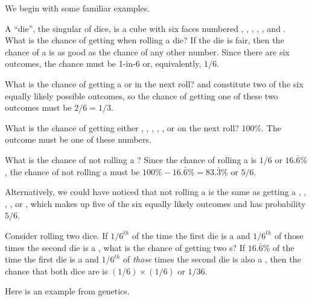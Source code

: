 We begin with some familiar examples.

\begin{example}{A ``die'', the singular of dice, is a cube with six faces numbered , , , , , and . What is the chance of getting  when rolling a die?}\label{probOf1}
If the die is fair, then the chance of a  is as good as the chance of any other number. Since there are six outcomes, the chance must be 1-in-6 or, equivalently, $1/6$.
\end{example}

\begin{example}{What is the chance of getting a  or  in the next roll?}\label{probOf1Or2}
 and  constitute two of the six equally likely possible outcomes, so the chance of getting one of these two outcomes must be $2/6 = 1/3$.
\end{example}

\begin{example}{What is the chance of getting either , , , , , or  on the next roll?}\label{probOf123456}
100\%. The outcome must be one of these numbers.
\end{example}

\begin{example}{What is the chance of not rolling a ?}\label{probNot2}
Since the chance of rolling a  is $1/6$ or $16.\bar{6}\%$, the chance of not rolling a  must be $100\% - 16.\bar{6}\%=83.\bar{3}\%$ or $5/6$.

Alternatively, we could have noticed that not rolling a  is the same as getting a , , , , or , which makes up five of the six equally likely outcomes and has probability $5/6$.
\end{example}

\begin{example}{Consider rolling two dice. If $1/6^{th}$ of the time the first die is a  and $1/6^{th}$ of those times the second die is a , what is the chance of getting two s?}\label{probOf2Ones}
If $16.\bar{6}$\% of the time the first die is a  and $1/6^{th}$ of \emph{those} times the second die is also a , then the chance that both dice are  is $(1/6)\times (1/6)$ or $1/36$.
\end{example}

Here is an example from genetics.

